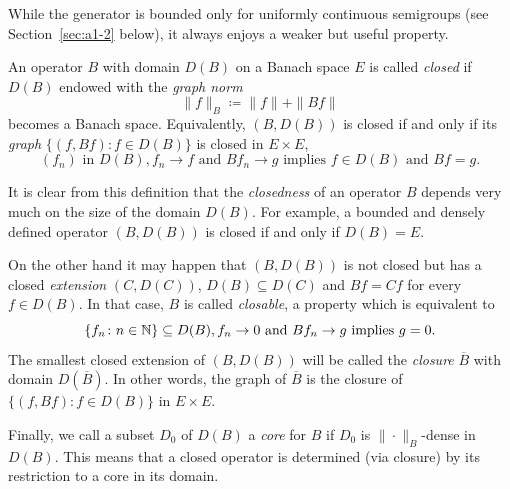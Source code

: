 While the generator is bounded only for uniformly continuous semigroups (see Section~\ref{sec:a1-2} below), it always enjoys a weaker but useful property.
\begin{definition}\label{def:a1-1.8}
An operator $B$ with domain $D(B)$ on a Banach space $E$ is called \emph{closed} if\/ $D(B)$ endowed with the \emph{graph norm}
\begin{equation*}\label{eq:a1-1.8}
	\|f\|_{B} \coloneq \|f\| + \|Bf\|
\end{equation*} 
becomes a Banach space.
Equivalently, $(B,D(B))$ is closed if and only if its \emph{graph} $\{(f,Bf) \colon f \in D(B)\}$ is closed in $E \times E$, \ie
\[
    (f_{n}) \text{ in } D(B), f_{n} \to f \text{ and } Bf_{n} \to g \text{ implies } f \in D(B) \text{ and } Bf = g.
\]
\end{definition}
It is clear from this definition that the \emph{closedness} of an operator $B$ depends very much on the size of the domain $D(B)$.
For example, a bounded and densely defined operator $(B,D(B))$ is closed if and only if\/ $D(B) = E$.

On the other hand it may happen that $(B,D(B))$ is not closed but has a closed \emph{extension} $(C,D(C))$, \ie  $ D(B) \subseteq D(C)$ and $Bf = Cf $ for every $f \in D(B)$.
In that case, $B$ is called \emph{closable}, a property which is equivalent to
\[
    \{f_{n} \colon n \in \mathbb{N} \} \subseteq D(B), f_{n} \to 0 \text{ and } Bf_{n} \to g \text{ implies } g = 0.
\]
The smallest closed extension of\/ $(B,D(B))$ will be called the \emph{closure} $\overline{B}$ with domain $D(\overline{B})$.
In other words, the graph of\/ $\overline{B}$ is the closure of\/ $\{(f,Bf) \colon f \in D(B)\}$ in $E \times E$.

Finally, we call a subset $D_{0}$ of\/ $D(B)$ a \emph{core} for $B$ if\/ $D_{0}$ is $\|\cdot\|_{B}$-dense in $D(B)$.
This means that a closed operator is determined (via closure) by its restriction to a core in its domain.

